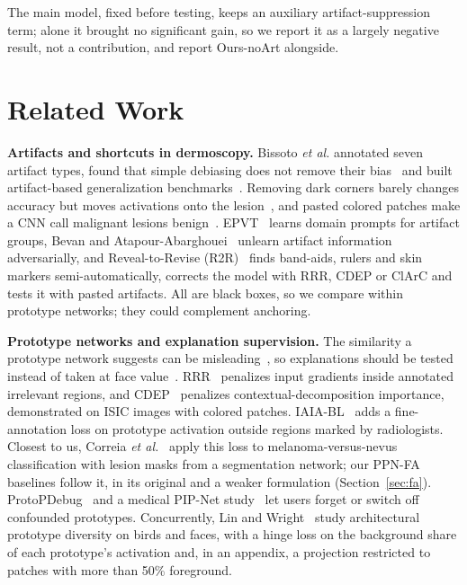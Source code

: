 \documentclass[conference]{IEEEtran}
\begin{document}
The main model, fixed before testing, keeps an auxiliary artifact-suppression term; alone it brought no significant gain, so we report it as a largely negative result, not a contribution, and report Ours-noArt alongside.

\section{Related Work}
\textbf{Artifacts and shortcuts in dermoscopy.} Bissoto \emph{et al.} annotated seven artifact types, found that simple debiasing does not remove their bias~\cite{bissoto2020} and built artifact-based generalization benchmarks~\cite{bissoto2022}. Removing dark corners barely changes accuracy but moves activations onto the lesion~\cite{pewton2022}, and pasted colored patches make a CNN call malignant lesions benign~\cite{nauta2022}. EPVT~\cite{yan2023} learns domain prompts for artifact groups, Bevan and Atapour-Abarghouei~\cite{bevan2022} unlearn artifact information adversarially, and Reveal-to-Revise (R2R)~\cite{pahde2023} finds band-aids, rulers and skin markers semi-automatically, corrects the model with RRR, CDEP or ClArC and tests it with pasted artifacts. All are black boxes, so we compare within prototype networks; they could complement anchoring.

\textbf{Prototype networks and explanation supervision.} The similarity a prototype network suggests can be misleading~\cite{hoffmann2021}, so explanations should be tested instead of taken at face value~\cite{adebayo2018}. RRR~\cite{ross2017} penalizes input gradients inside annotated irrelevant regions, and CDEP~\cite{rieger2020} penalizes contextual-decomposition importance, demonstrated on ISIC images with colored patches. IAIA-BL~\cite{barnett2021} adds a fine-annotation loss on prototype activation outside regions marked by radiologists. Closest to us, Correia \emph{et al.}~\cite{correia2023} apply this loss to melanoma-versus-nevus classification with lesion masks from a segmentation network; our PPN-FA baselines follow it, in its original and a weaker formulation (Section~\ref{sec:fa}). ProtoPDebug~\cite{bontempelli2023} and a medical PIP-Net study~\cite{nauta2023pip} let users forget or switch off confounded prototypes. Concurrently, Lin and Wright~\cite{lin2026} study architectural prototype diversity on birds and faces, with a hinge loss on the background share of each prototype's activation and, in an appendix, a projection restricted to patches with more than 50\% foreground.
\end{document}
